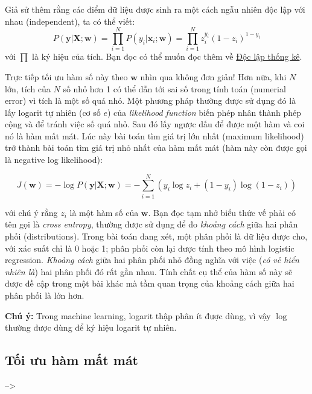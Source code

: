 Giả sử thêm rằng các điểm dữ liệu được sinh ra một cách ngẫu nhiên độc lập với nhau (independent), ta có thể viết: 
\begin{equation}
P(\mathbf{y}|\mathbf{X}; \mathbf{w}) = \prod_{i=1}^N P(y_i| \mathbf{x}_i; \mathbf{w}) = \prod_{i=1}^N z_i^{y_i}(1 - z_i)^{1- y_i} 
\end{equation}
với $\prod$ là ký hiệu của tích. Bạn đọc có thể muốn đọc thêm về \href{https://vi.wikipedia.org/wiki/Độc_lập_thống_kê}{Độc lập thống kê}. 
 
Trực tiếp tối ưu hàm số này theo $\mathbf{w}$ nhìn qua không đơn giản! Hơn nữa, khi $N$ lớn, tích của $N$ số nhỏ hơn 1 có thể dẫn tới sai số trong tính toán (numerial error) vì tích là một số quá nhỏ. Một phương pháp thường được sử dụng đó là lấy logarit tự nhiên (cơ số $e$) của  \textit{likelihood function} biến phép nhân thành phép cộng và để tránh việc số quá nhỏ. Sau đó lấy ngược dấu để được một hàm và coi nó là hàm mất mát. Lúc này bài toán tìm giá trị lớn nhất (maximum likelihood) trở thành bài toán tìm giá trị nhỏ nhất của hàm mất mát (hàm này còn được gọi là negative log likelihood): 

\begin{equation}
J(\mathbf{w}) = -\log P(\mathbf{y}|\mathbf{X}; \mathbf{w}) = -\sum_{i=1}^N(y_i \log {z}_i + (1-y_i) \log (1 - {z}_i)) 
\end{equation}

với chú ý rằng $z_i$ là một hàm số của $\mathbf{w}$. Bạn đọc tạm nhớ biểu thức vế phải có tên gọi là \textit{cross entropy}, thường được sử dụng để đo \textit{khoảng cách} giữa hai phân phối (distributions). Trong bài toán đang xét, một phân phối là dữ liệu được cho, với xác suất chỉ là 0 hoặc 1; phân phối còn lại được tính theo mô hình logistic regression. \textit{Khoảng cách} giữa hai phân phối nhỏ đồng nghĩa với việc (\textit{có vẻ hiển nhiên là}) hai phân phối đó rất gần nhau. Tính chất cụ thể của hàm số này sẽ được đề cập trong một bài khác mà tầm quan trọng của khoảng cách giữa hai phân phối là lớn hơn. 
 
\textbf{Chú ý:} Trong machine learning, logarit thập phân ít được dùng, vì vậy $\log$ thường được dùng để ký hiệu logarit tự nhiên. 
 
 
 
\subsection{Tối ưu hàm mất mát}
 
 --> 
 

